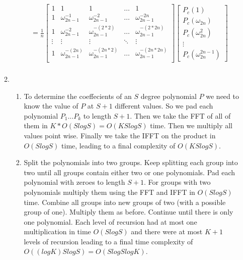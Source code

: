\documentclass[a4paper]{article}
\begin{document}
\begin{enumerate}
\begin{enumerate}
\begin{align*}
                &=
                \frac{1}{n}
                \left[ \begin{array}{ccccc} 1 & 1 & 1 & \dots & 1 \\ 1 & \omega_{2n-1}^{-1} & \omega_{2n-1}^{-2} & \dots & \omega_{2n-1}^{-2n} 
                \\ 1 & \omega_{2n-1}^{-2} & \omega_{2n-1}^{-(2*2)} & \dots & \omega_{2n-1}^{-(2*2n)} 
            \\ \vdots & \vdots & \vdots & \ddots & \vdots \\
                1 & \omega_{2n-1}^{-(2n)} & \omega_{2n-1}^{-(2n * 2)} & \dots & \omega_{2n-1}^{-(2n * 2n)} \\
            \end{array}\right]  \left[ \begin{array}{c} P_c (1) \\ P_c (\omega_{2n}) \\ P_c (\omega_{2n}^{2})\\ \vdots \\ P_c (\omega_{2n}^{2n-1}) \end{array} \right] \\
        \end{align*}
\item \begin{enumerate}
				\item To determine the coeffecients of an $S$ degree polynomial $P$ we need to know the value of $P$ at $S+1$ different values. So we pad each polynomial $P_1 ... P_k$ to length $S+1$. Then we take the FFT of all of them in $K*O(SlogS)=O(KSlogS)$ time. Then we multiply all values point wise. Finally we take the IFFT on the product in $O(SlogS)$ time, leading to a final complexity of $O(KSlogS)$.
				\item Split the polynomials into two groups. Keep splitting each group into two until all groups contain either two or one polynomials. Pad each polynomial with zeroes to length $S+1$. For groups with two polynomials multiply them using the FFT and IFFT in $O(SlogS)$ time. Combine all groups into new groups of two (with a possible group of one). Multiply them as before. Continue until there is only one polynomial. Each level of recursion had at most one multiplication in time $O(SlogS)$ and there were at most $K+1$ levels of recursion leading to a final time complexity of $O((logK)SlogS) = O(SlogSlogK)$.
\end{enumerate}


\end{enumerate}
\end{enumerate}
\end{document}
